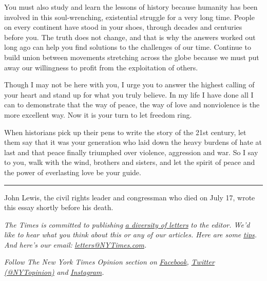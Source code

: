 You must also study and learn the lessons of history because humanity
has been involved in this soul-wrenching, existential struggle for a
very long time. People on every continent have stood in your shoes,
through decades and centuries before you. The truth does not change, and
that is why the answers worked out long ago can help you find solutions
to the challenges of our time. Continue to build union between movements
stretching across the globe because we must put away our willingness to
profit from the exploitation of others.

Though I may not be here with you, I urge you to answer the highest
calling of your heart and stand up for what you truly believe. In my
life I have done all I can to demonstrate that the way of peace, the way
of love and nonviolence is the more excellent way. Now it is your turn
to let freedom ring.

When historians pick up their pens to write the story of the 21st
century, let them say that it was your generation who laid down the
heavy burdens of hate at last and that peace finally triumphed over
violence, aggression and war. So I say to you, walk with the wind,
brothers and sisters, and let the spirit of peace and the power of
everlasting love be your guide.

\begin{center}\rule{0.5\linewidth}{\linethickness}\end{center}

John Lewis, the civil rights leader and congressman who died on July 17,
wrote this essay shortly before his death.

\emph{The Times is committed to publishing}
\href{https://slack-redir.net/link?url=https\%3A\%2F\%2Fwww.nytimes3xbfgragh.onion\%2F2019\%2F01\%2F31\%2Fopinion\%2Fletters\%2Fletters-to-editor-new-york-times-women.html}{\emph{a
diversity of letters}} \emph{to the editor. We'd like to hear what you
think about this or any of our articles. Here are some}
\href{https://slack-redir.net/link?url=https\%3A\%2F\%2Fhelp.nytimes3xbfgragh.onion\%2Fhc\%2Fen-us\%2Farticles\%2F115014925288-How-to-submit-a-letter-to-the-editor}{\emph{tips}}\emph{.
And here's our email:}
\href{mailto:letters@NYTimes.com}{\emph{letters@NYTimes.com}}\emph{.}

\emph{Follow The New York Times Opinion section on}
\href{https://slack-redir.net/link?url=https\%3A\%2F\%2Fwww.facebookcorewwwi.onion\%2Fnytopinion}{\emph{Facebook}}\emph{,}
\href{https://slack-redir.net/link?url=http\%3A\%2F\%2Ftwitter.com\%2FNYTOpinion}{\emph{Twitter
(@NYTopinion)}} \emph{and}
\href{https://slack-redir.net/link?url=https\%3A\%2F\%2Fwww.instagram.com\%2Fnytopinion\%2F}{\emph{Instagram}}\emph{.}

